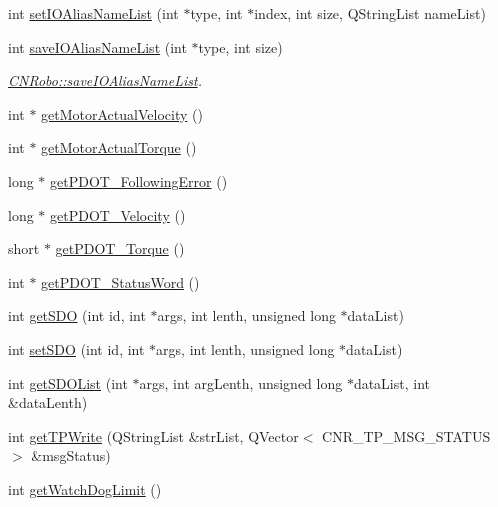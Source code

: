 \begin{DoxyCompactItemize}
\item 
int \hyperlink{classCNRobo_a80d38af2de2ce96377be9fae39fee1c6}{set\-I\-O\-Alias\-Name\-List} (int $\ast$type, int $\ast$index, int size, Q\-String\-List name\-List)
\item 
int \hyperlink{classCNRobo_a73bf3698d0dab9722eca46a5b37302b3}{save\-I\-O\-Alias\-Name\-List} (int $\ast$type, int size)
\begin{DoxyCompactList}\small\item\em \hyperlink{classCNRobo_a73bf3698d0dab9722eca46a5b37302b3}{C\-N\-Robo\-::save\-I\-O\-Alias\-Name\-List}. \end{DoxyCompactList}\item 
int $\ast$ \hyperlink{classCNRobo_a757e3abd9b8cb481d1d435a4de85ce7d}{get\-Motor\-Actual\-Velocity} ()
\item 
int $\ast$ \hyperlink{classCNRobo_a1033cc36a3d1e680c36f0da20a73d546}{get\-Motor\-Actual\-Torque} ()
\item 
long $\ast$ \hyperlink{classCNRobo_a001346df3874ea11b6a34412771bf4ec}{get\-P\-D\-O\-T\-\_\-\-Following\-Error} ()
\item 
long $\ast$ \hyperlink{classCNRobo_a72ccc455bec57054d8406e80212e7873}{get\-P\-D\-O\-T\-\_\-\-Velocity} ()
\item 
short $\ast$ \hyperlink{classCNRobo_aaa01fffa9124ae814498995206b3ec2a}{get\-P\-D\-O\-T\-\_\-\-Torque} ()
\item 
int $\ast$ \hyperlink{classCNRobo_a5693331cf6d9b4b270e09ee9e35cfe3d}{get\-P\-D\-O\-T\-\_\-\-Status\-Word} ()
\item 
int \hyperlink{classCNRobo_acc986829fea01e03b0025547bf98081f}{get\-S\-D\-O} (int id, int $\ast$args, int lenth, unsigned long $\ast$data\-List)
\item 
int \hyperlink{classCNRobo_a6cdaae276ac88dc9bdaa730905a8296a}{set\-S\-D\-O} (int id, int $\ast$args, int lenth, unsigned long $\ast$data\-List)
\item 
int \hyperlink{classCNRobo_ad4540398cec02c93474ab2ea549e71f9}{get\-S\-D\-O\-List} (int $\ast$args, int arg\-Lenth, unsigned long $\ast$data\-List, int \&data\-Lenth)
\item 
int \hyperlink{classCNRobo_a24df54093b53d2254e8d5b78646509e5}{get\-T\-P\-Write} (Q\-String\-List \&str\-List, Q\-Vector$<$ C\-N\-R\-\_\-\-T\-P\-\_\-\-M\-S\-G\-\_\-\-S\-T\-A\-T\-U\-S $>$ \&msg\-Status)
\item 
int \hyperlink{classCNRobo_a95104d81f71781243fe3deeda77e9fdf}{get\-Watch\-Dog\-Limit} ()
\item 

\end{DoxyCompactItemize}
